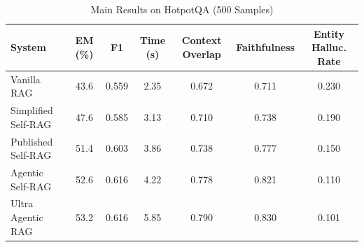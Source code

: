 
\begin{table}[h]
\centering
\caption{Main Results on HotpotQA (500 Samples)}
\label{tab:main_results}
\begin{tabular}{lcccccc}
\toprule
System & EM (\%) & F1 & Time (s) & Context Overlap & Faithfulness & Entity Halluc. Rate \\
\midrule
Vanilla RAG & 43.6 & 0.559 & 2.35 & 0.672 & 0.711 & 0.230 \\
Simplified Self-RAG & 47.6 & 0.585 & 3.13 & 0.710 & 0.738 & 0.190 \\
Published Self-RAG & 51.4 & 0.603 & 3.86 & 0.738 & 0.777 & 0.150 \\
Agentic Self-RAG & 52.6 & 0.616 & 4.22 & 0.778 & 0.821 & 0.110 \\
Ultra Agentic RAG & 53.2 & 0.616 & 5.85 & 0.790 & 0.830 & 0.101 \\
\bottomrule
\end{tabular}
\end{table}
